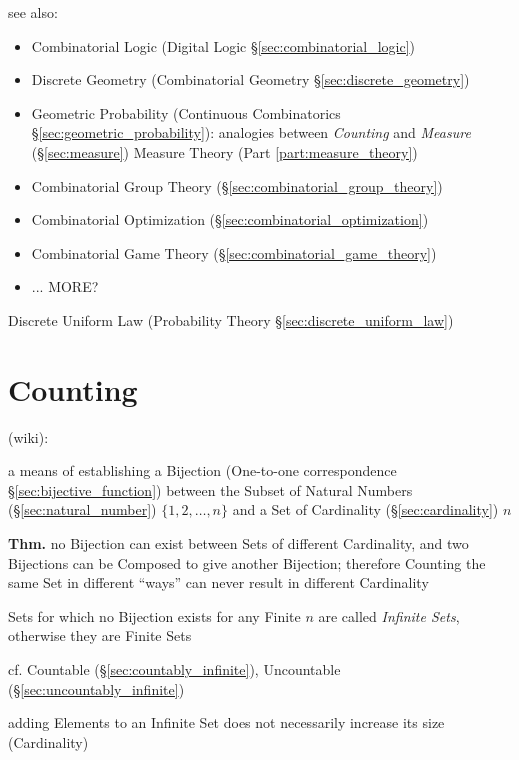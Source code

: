 see also:
\begin{itemize}
  \item Combinatorial Logic (Digital Logic \S\ref{sec:combinatorial_logic})
  \item Discrete Geometry (Combinatorial Geometry \S\ref{sec:discrete_geometry})
  \item Geometric Probability (Continuous Combinatorics
    \S\ref{sec:geometric_probability}): analogies between \emph{Counting} and
    \emph{Measure} (\S\ref{sec:measure}) \fist Measure Theory (Part
    \ref{part:measure_theory})
  \item Combinatorial Group Theory (\S\ref{sec:combinatorial_group_theory})
  \item Combinatorial Optimization (\S\ref{sec:combinatorial_optimization})
  \item Combinatorial Game Theory (\S\ref{sec:combinatorial_game_theory})
  \item ... MORE?
\end{itemize}

\fist Discrete Uniform Law (Probability Theory \S\ref{sec:discrete_uniform_law})



\section{Counting}\label{sec:counting}

(wiki):

a means of establishing a Bijection (One-to-one correspondence
\S\ref{sec:bijective_function}) between the Subset of Natural Numbers
(\S\ref{sec:natural_number}) $\{1, 2, \ldots, n\}$ and a Set of Cardinality
(\S\ref{sec:cardinality}) $n$

\textbf{Thm.} no Bijection can exist between Sets of different Cardinality, and
two Bijections can be Composed to give another Bijection; therefore Counting the
same Set in different ``ways'' can never result in different Cardinality

Sets for which no Bijection exists for any Finite $n$ are called \emph{Infinite
  Sets}, otherwise they are Finite Sets

cf. Countable (\S\ref{sec:countably_infinite}), Uncountable
(\S\ref{sec:uncountably_infinite})

adding Elements to an Infinite Set does not necessarily increase its size
(Cardinality)



